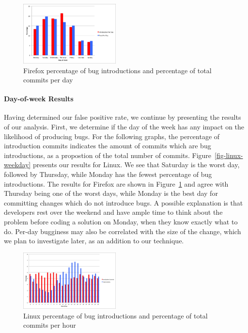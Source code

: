 \begin{figure}
\begin{center}
\includegraphics[width=0.45\textwidth]{firefox_bug_introduction_day_of_week.png}
\end{center}
\caption{Firefox percentage of bug introductions and percentage of total commits per day}
\label{fig-firefox-weekday}
\end{figure}

\paragraph{Day-of-week Results} Having determined our false positive rate, 
we continue by presenting the results of our analysis.  First, we
determine if the day of the week has any impact on the likelihood of
producing bugs. For the following graphs, the percentage of
introduction commits indicates the amount of commits which are bug
introductions, as a propostion of the total number of
commits. Figure~\ref{fig-linux-weekday} presents our results for
Linux. We see that Saturday is the worst day, followed by Thursday,
while Monday has the fewest percentage of bug introductions. The
results for Firefox are shown in Figure~\ref{fig-firefox-weekday} and
agree with Thursday being one of the worst days, while Monday is the
best day for committing changes which do not introduce bugs. A
possible explanation is that developers rest over the weekend and have
ample time to think about the problem before coding a solution on
Monday, when they know exactly what to do. Per-day bugginess may also
be correlated with the size of the change, which we plan to investigate
later, as an addition to our technique.

\begin{figure}
\begin{center}
\includegraphics[width=0.45\textwidth]{linux_hour_of_day.png}
\end{center}
\caption{Linux percentage of bug introductions and percentage of total commits per hour}
\label{fig-linux-hour}
\end{figure}

